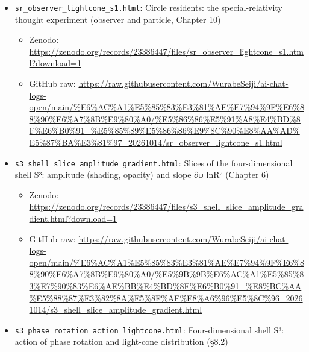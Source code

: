 \documentclass[
  a4paper,
]{article}
\providecommand{\tightlist}{%
  \setlength{\itemsep}{0pt}\setlength{\parskip}{0pt}}
\begin{document}
\begin{itemize}
  \begin{itemize}
  \tightlist
  \item
    Zenodo:
    \url{https://zenodo.org/records/23386447/files/circle_phase_rotation_action_lightcone_v2.html?download=1}
  \item
    GitHub raw:
    \url{https://raw.githubusercontent.com/WurabeSeiji/ai-chat-logs-open/main/\%E6\%AC\%A1\%E5\%85\%83\%E3\%81\%AE\%E7\%94\%9F\%E6\%88\%90\%E6\%A7\%8B\%E9\%80\%A0/\%E5\%86\%86\%E5\%91\%A8\%E4\%BD\%8F\%E6\%B0\%91_\%E5\%85\%89\%E5\%86\%86\%E9\%8C\%90\%E8\%AA\%AD\%E5\%87\%BA\%E3\%81\%97_20261014/circle_phase_rotation_action_lightcone_v2.html}
  \end{itemize}
\item
  \texttt{sr\_\allowbreak{}observer\_\allowbreak{}lightcone\_\allowbreak{}s1.html}: Circle residents: the
  special-relativity thought experiment (observer and particle, Chapter
  10)

  \begin{itemize}
  \tightlist
  \item
    Zenodo:
    \url{https://zenodo.org/records/23386447/files/sr_observer_lightcone_s1.html?download=1}
  \item
    GitHub raw:
    \url{https://raw.githubusercontent.com/WurabeSeiji/ai-chat-logs-open/main/\%E6\%AC\%A1\%E5\%85\%83\%E3\%81\%AE\%E7\%94\%9F\%E6\%88\%90\%E6\%A7\%8B\%E9\%80\%A0/\%E5\%86\%86\%E5\%91\%A8\%E4\%BD\%8F\%E6\%B0\%91_\%E5\%85\%89\%E5\%86\%86\%E9\%8C\%90\%E8\%AA\%AD\%E5\%87\%BA\%E3\%81\%97_20261014/sr_observer_lightcone_s1.html}
  \end{itemize}
\item
  \texttt{s3\_\allowbreak{}shell\_\allowbreak{}slice\_\allowbreak{}amplitude\_\allowbreak{}gradient.html}: Slices of the
  four-dimensional shell S³: amplitude (shading, opacity) and slope ∂ψ
  ln\textbar R²\textbar{} (Chapter 6)

  \begin{itemize}
  \tightlist
  \item
    Zenodo:
    \url{https://zenodo.org/records/23386447/files/s3_shell_slice_amplitude_gradient.html?download=1}
  \item
    GitHub raw:
    \url{https://raw.githubusercontent.com/WurabeSeiji/ai-chat-logs-open/main/\%E6\%AC\%A1\%E5\%85\%83\%E3\%81\%AE\%E7\%94\%9F\%E6\%88\%90\%E6\%A7\%8B\%E9\%80\%A0/\%E5\%9B\%9B\%E6\%AC\%A1\%E5\%85\%83\%E7\%90\%83\%E6\%AE\%BB\%E4\%BD\%8F\%E6\%B0\%91_\%E8\%BC\%AA\%E5\%88\%87\%E3\%82\%8A\%E5\%8F\%AF\%E8\%A6\%96\%E5\%8C\%96_20261014/s3_shell_slice_amplitude_gradient.html}
  \end{itemize}
\item
  \texttt{s3\_\allowbreak{}phase\_\allowbreak{}rotation\_\allowbreak{}action\_\allowbreak{}lightcone.html}: Four-dimensional
  shell S³: action of phase rotation and light-cone distribution (§8.2)


\end{itemize}
\end{document}
